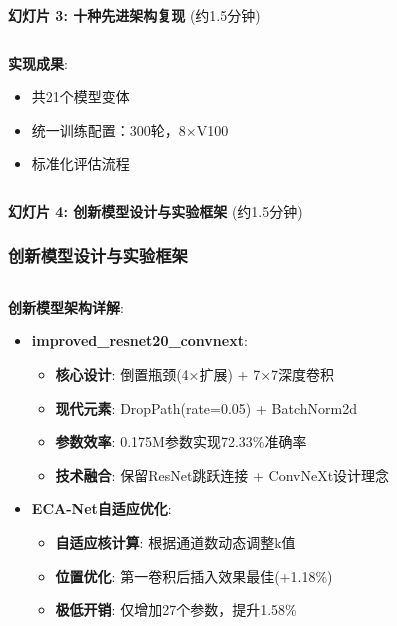 \documentclass[10pt]{beamer}
\begin{document}
\begin{frame}{\textbf{幻灯片 3: 十种先进架构复现} (约1.5分钟)}
{\begin{columns}[T]
\begin{column}{0.5\textwidth}
        \vspace{0.1em}
        \textbf{实现成果}:
        \begin{itemize}
            \item 共21个模型变体
            \item 统一训练配置：300轮，8×V100
            \item 标准化评估流程
        \end{itemize}
    \end{column}
\end{columns}
}

\end{frame}

\begin{frame}{\textbf{幻灯片 4: 创新模型设计与实验框架} (约1.5分钟)}
\frametitle{创新模型设计与实验框架}

{\footnotesize
\begin{columns}[T]
    \begin{column}{0.5\textwidth}
        \textbf{创新模型架构详解}:
        \begin{itemize}
            \item \textbf{improved\_resnet20\_convnext}:
            \begin{itemize}
                \item \textbf{核心设计}: 倒置瓶颈(4×扩展) + 7×7深度卷积
                \item \textbf{现代元素}: DropPath(rate=0.05) + BatchNorm2d
                \item \textbf{参数效率}: 0.175M参数实现72.33\%准确率
                \item \textbf{技术融合}: 保留ResNet跳跃连接 + ConvNeXt设计理念
            \end{itemize}
            \item \textbf{ECA-Net自适应优化}:
            \begin{itemize}
                \item \textbf{自适应核计算}: 根据通道数动态调整k值
                \item \textbf{位置优化}: 第一卷积后插入效果最佳(+1.18\%)
                \item \textbf{极低开销}: 仅增加27个参数，提升1.58\%
            \end{itemize}
        \end{itemize}
        

\end{column}
\end{columns}}
\end{frame}
\end{document}
